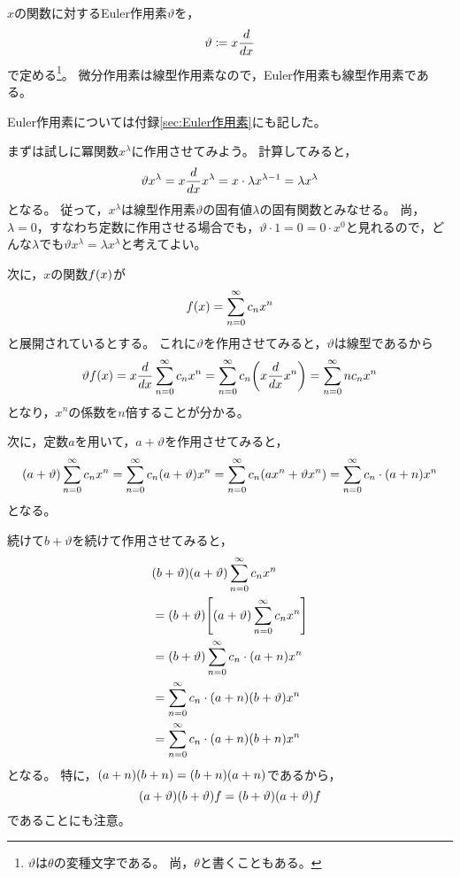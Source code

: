 \documentclass[a4paper,draft]{ltjsarticle}
\begin{document}
\begin{defi}[Euler作用素]\label{def:gauss-ode-EulerOperator}
    $x$の関数に対するEuler作用素$\vartheta$を，
    \begin{equation}
        \vartheta\coloneqq x\frac{d }{d x}
    \end{equation}
    で定める\footnote{$\vartheta$は$\theta$の変種文字である。
    尚，$\theta$と書くこともある。}。
    微分作用素は線型作用素なので，Euler作用素も線型作用素である。
\end{defi}

Euler作用素については付録\ref{sec:Euler作用素}にも記した。

まずは試しに冪関数$x^\lambda$に作用させてみよう。
計算してみると，
\begin{equation}
    \vartheta x^{\lambda}=x\frac{d }{d x}x^{\lambda}=x\cdot \lambda x^{\lambda -1}=\lambda x^{\lambda}
\end{equation}
となる。
従って，$x^{\lambda}$は線型作用素$\vartheta$の固有値$\lambda$の固有関数とみなせる。
尚，$\lambda=0$，すなわち定数に作用させる場合でも，$\vartheta\cdot 1=0=0\cdot x^{0}$と見れるので，どんな$\lambda$でも$\vartheta x^{\lambda}=\lambda x^{\lambda}$と考えてよい。

次に，$x$の関数$\fun{f}{x}$が
\begin{equation}
    \fun{f}{x}=\sum_{n=0}^\infty c_nx^n
\end{equation}
と展開されているとする。
これに$\vartheta$を作用させてみると，$\vartheta$は線型であるから
\begin{equation}
    \vartheta\fun{f}{x}=x\diff{}{x}\sum_{n=0}^\infty c_nx^n
    =\sum_{n=0}^\infty c_n\pare{x\diff{}{x} x^n}=\sum_{n=0}^\infty nc_nx^n
\end{equation}
となり，$x^n$の係数を$n$倍することが分かる。

次に，定数$a$を用いて，$a+\vartheta$を作用させてみると，
\begin{equation}
    \pare{a+\vartheta}\sum_{n=0}^\infty c_nx^n
    =\sum_{n=0}^\infty c_n \pare{a+\vartheta}x^n
    =\sum_{n=0}^\infty c_n\pare{ax^n+\vartheta x^{n}}
    =\sum_{n=0}^\infty c_n\cdot \pare{a+n}x^n
\end{equation}
となる。

続けて$b+\vartheta$を続けて作用させてみると，
\begin{align}
    &\pare{b+\vartheta}\pare{a+\vartheta}\sum_{n=0}^\infty c_nx^n
    \\
    &=\pare{b+\vartheta}\squ{\pare{a+\vartheta}\sum_{n=0}^\infty c_nx^n}
    \\
    &=\pare{b+\vartheta}\sum_{n=0}^\infty c_n\cdot \pare{a+n}x^n
    \\
    &=\sum_{n=0}^\infty c_n\cdot \pare{a+n} \pare{b+\vartheta}x^n
    \\
    &=\sum_{n=0}^\infty c_n\cdot \pare{a+n}\pare{b+n}x^n
\end{align}
となる。
特に，$\pare{a+n}\pare{b+n}=\pare{b+n}\pare{a+n}$であるから，
\begin{equation}
    \pare{a+\vartheta}\pare{b+\vartheta}f=\pare{b+\vartheta}\pare{a+\vartheta}f
\end{equation}
であることにも注意。
\end{document}

